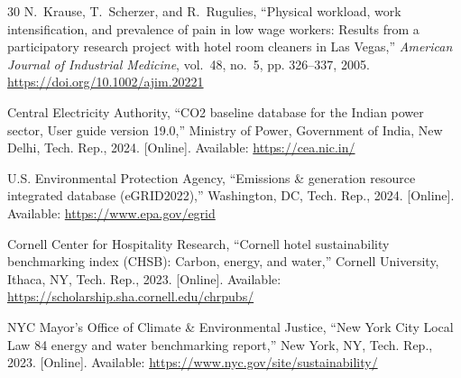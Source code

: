 \documentclass[11pt,a4paper]{article}
\begin{document}
\begin{thebibliography}{30}
N.~Krause, T.~Scherzer, and R.~Rugulies, ``Physical workload, work intensification, and prevalence of pain in low wage workers: Results from a participatory research project with hotel room cleaners in Las Vegas,'' \emph{American Journal of Industrial Medicine}, vol.~48, no.~5, pp. 326--337, 2005. \url{https://doi.org/10.1002/ajim.20221}

Central Electricity Authority, ``CO2 baseline database for the Indian power sector, User guide version 19.0,'' Ministry of Power, Government of India, New Delhi, Tech. Rep., 2024. [Online]. Available: \url{https://cea.nic.in/}

U.S. Environmental Protection Agency, ``Emissions \& generation resource integrated database (eGRID2022),'' Washington, DC, Tech. Rep., 2024. [Online]. Available: \url{https://www.epa.gov/egrid}

Cornell Center for Hospitality Research, ``Cornell hotel sustainability benchmarking index (CHSB): Carbon, energy, and water,'' Cornell University, Ithaca, NY, Tech. Rep., 2023. [Online]. Available: \url{https://scholarship.sha.cornell.edu/chrpubs/}

NYC Mayor's Office of Climate \& Environmental Justice, ``New York City Local Law 84 energy and water benchmarking report,'' New York, NY, Tech. Rep., 2023. [Online]. Available: \url{https://www.nyc.gov/site/sustainability/}

\end{thebibliography}
\end{document}
